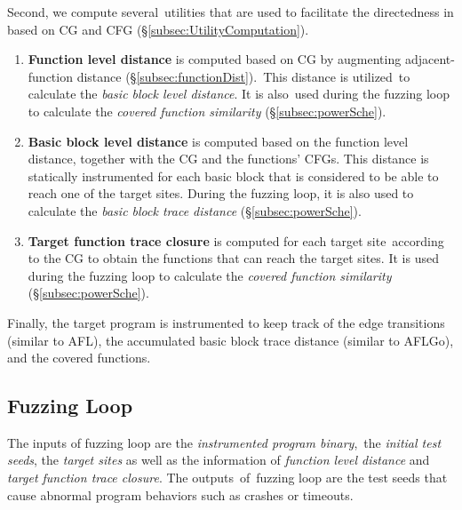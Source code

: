 Second, we compute several~utilities that are used to facilitate the directedness in \dFOT based on CG and CFG (\S\ref{subsec:UtilityComputation}).
\begin{enumerate}[(1)]
\item \textbf{Function level distance} is computed based on CG by augmenting adjacent-function distance (\S\ref{subsec:functionDist}).~This distance is utilized~to calculate the \textit{basic block level distance}. It is also~used during the fuzzing loop to calculate the \emph{covered function similarity} (\S\ref{subsec:powerSche}).
    
\item \textbf{Basic block level distance} is computed based on the function level distance, together with the CG and the functions' CFGs. This distance is statically instrumented for each basic block that is considered to be able to reach one of the target sites. During the fuzzing loop, it is also used to calculate the \emph{basic block trace distance} (\S\ref{subsec:powerSche}).

\item \textbf{Target function trace closure} is computed for each target site~according to the CG to obtain the functions that can reach the target sites. It is used during the fuzzing loop to calculate the \emph{covered function similarity} (\S\ref{subsec:powerSche}).
\end{enumerate}

Finally, the target program is instrumented to keep track of the edge transitions (similar to AFL), the accumulated basic block trace distance (similar to AFLGo), and the covered functions.


\subsection{Fuzzing Loop}\label{sec:fuzz_flow}

The inputs of fuzzing loop are the \textit{instrumented program binary},~the \textit{initial test seeds}, the \textit{target sites} as well as the information of \textit{function level distance} and \textit{target function trace closure}.
The outputs~of~fuzzing loop are the test seeds that cause abnormal program behaviors such as crashes or timeouts.


